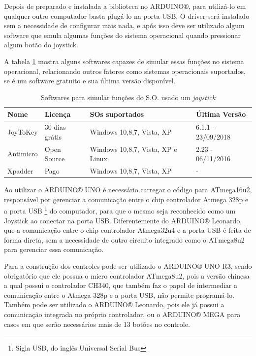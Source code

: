 \documentclass[
	12pt,			%
	openright,		%
	oneside,			%
	a4paper,			%
	chapter=TITLE,		%
	english,			%
	brazil,			%
	]{abntex2}
\begin{document}
Depois de preparado e instalada a biblioteca no ARDUINO®, para utilizá-lo em qualquer outro computador basta plugá-lo na porta USB. O driver será instalado sem a necessidade de configurar mais nada, e após isso deve ser utilizado algum software que emula algumas funções do sistema operacional quando pressionar algum botão do joystick.

A tabela \ref{tab:tab-3} mostra alguns softwares capazes de simular essas funções no sistema operacional, relacionando outros fatores como sistemas operacionais suportados, se é um software gratuito e sua última versão disponível.

\begin{table}[H]
\caption{Softwares para simular funções do S.O. usado um \emph{joystick}}
\label{tab:tab-3}
{
\centering
\footnotesize
\begin{tabular}{|p{2cm}|p{3cm}|p{6cm}|p{3cm}|}
\hline
\textbf{Nome} & \textbf{Licença} & \textbf{SOs suportados} & \textbf{Última Versão}\\
\hline
JoyToKey	&30 dias grátis				&Windows 10,8,7, Vista, XP		&6.1.1 - 23/09/2018\\
\hline
Antimicro	&Open Source				&Windows 10,8,7, Vista, XP e Linux.	&2.23 - 06/11/2016\\
\hline
Xpadder	&Pago						&Windows 10,8,7, Vista, XP 		&-\\
\hline
\end{tabular}
}
\end{table}

Ao utilizar o ARDUINO® UNO é necessário carregar o código para ATmega16u2, responsável por gerenciar a comunicação entre o chip controlador Atmega 328p e a porta USB \footnote{Sigla USB, do inglês Universal Serial Bus} do computador, para que o mesmo seja reconhecido como um Joystick ao conectar na porta USB. Diferentemente do ARDUINO® Leonardo, que a comunicação entre o chip controlador Atmega32u4 e a porta USB é feita de forma direta, sem a necessidade de outro circuito integrado como o ATmega8u2 para gerenciar essa comunicação.

Para a construção dos controles pode ser utilizado o ARDUINO® UNO R3, sendo obrigatório que ele possua o micro controlador ATmega8u2, pois a versão chinesa a qual possui o controlador CH340, que também faz o papel de intermediar a comunicação entre o Atmega 328p e a porta USB, não permite programá-lo. Também pode ser utilizado o ARDUINO® Leonardo, pois ele já possui a comunicação integrada no próprio controlador, ou o ARDUINO® MEGA para casos em que serão necessários mais de 13 botões no controle.
\end{document}

